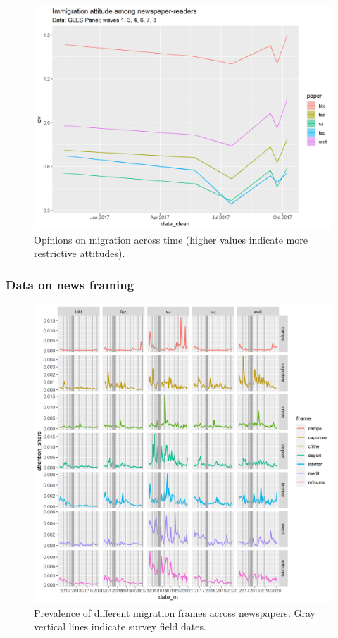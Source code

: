 \documentclass{article}
\begin{document}
\begin{figure}[!ht]
    \centering
    \includegraphics[width=\textwidth]{paper/vis/Immigration_papers.png}
    \caption{Opinions on migration across time (higher values indicate more restrictive attitudes).}
    \label{fig:issues}
\end{figure}


\subsubsection{Data on news framing}
\begin{figure}[!ht]
    \centering
    \includegraphics[width=\textwidth]{paper/vis/frames_papers_wtd_focus.png}
    \caption{Prevalence of different migration frames across newspapers. Gray vertical lines indicate survey field dates.}
    \label{fig:frames}
\end{figure}
\end{document}
